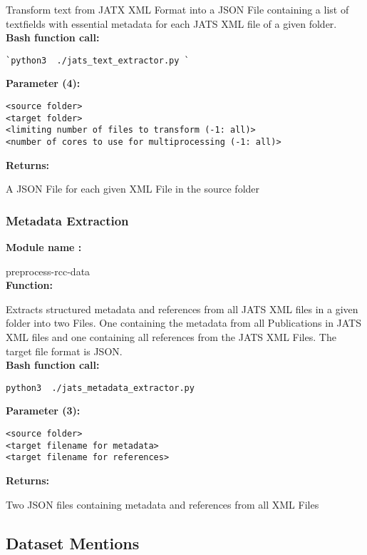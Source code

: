 Transform text from JATX XML Format into a JSON File containing a list of textfields with essential metadata for each JATS XML file of a given folder.\\
\textbf{Bash function call: }
\begin{lstlisting}
`python3  ./jats_text_extractor.py `
\end{lstlisting}
\textbf{Parameter (4): }
\begin{lstlisting}
<source folder>
<target folder>
<limiting number of files to transform (-1: all)> 
<number of cores to use for multiprocessing (-1: all)>
\end{lstlisting}
\textbf{Returns: }

A JSON File for each given XML File in the source folder

\subsubsection{Metadata Extraction}
\textbf{Module name : }

preprocess-rcc-data\\
\textbf{Function: }

Extracts structured metadata and references from all JATS XML files in a given folder into two Files.
One containing the metadata from all Publications in JATS XML files and one containing all references from the JATS XML Files.
The target file format is JSON.\\
\textbf{Bash function call: }
\begin{lstlisting}
python3  ./jats_metadata_extractor.py
\end{lstlisting}
\textbf{Parameter (3): }
\begin{lstlisting}
<source folder>
<target filename for metadata>
<target filename for references>
\end{lstlisting}
\textbf{Returns: }

Two JSON files containing metadata and references from all XML Files

\subsection{Dataset Mentions}
